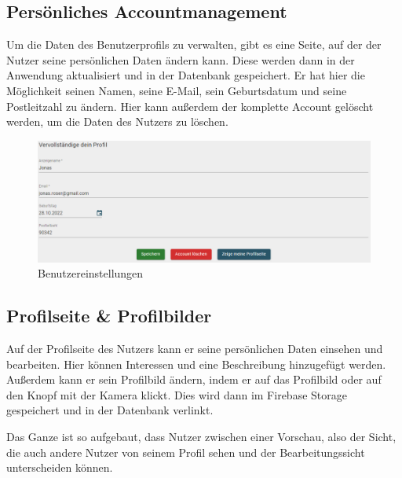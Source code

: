 \clearpage

\subsection{Persönliches Accountmanagement}
\label{sec:accountmanagement}

Um die Daten des Benutzerprofils zu verwalten, gibt es eine Seite, auf der der Nutzer seine persönlichen Daten ändern kann.
Diese werden dann in der Anwendung aktualisiert und in der Datenbank gespeichert. Er hat hier die Möglichkeit seinen Namen, seine E-Mail, sein Geburtsdatum und seine Postleitzahl zu ändern.
Hier kann außerdem der komplette Account gelöscht werden, um die Daten des Nutzers zu löschen.

\begin{figure}[ht!]
  \begin{centering}
    \includegraphics[width=1\textwidth]{figures/implementation/userSettings.png}
    \caption{Benutzereinstellungen}
    \label{fig:userSettings}
  \end{centering}
\end{figure}

\subsection{Profilseite \& Profilbilder}
\label{sec:profilepictures}

Auf der Profilseite des Nutzers kann er seine persönlichen Daten einsehen und bearbeiten. Hier können Interessen und eine Beschreibung hinzugefügt werden.
Außerdem kann er sein Profilbild ändern, indem er auf das Profilbild oder auf den Knopf mit der Kamera klickt.
Dies wird dann im Firebase Storage gespeichert und in der Datenbank verlinkt.

Das Ganze ist so aufgebaut, dass Nutzer zwischen einer Vorschau, also der Sicht, die auch andere Nutzer von seinem Profil sehen und der Bearbeitungssicht unterscheiden können.

